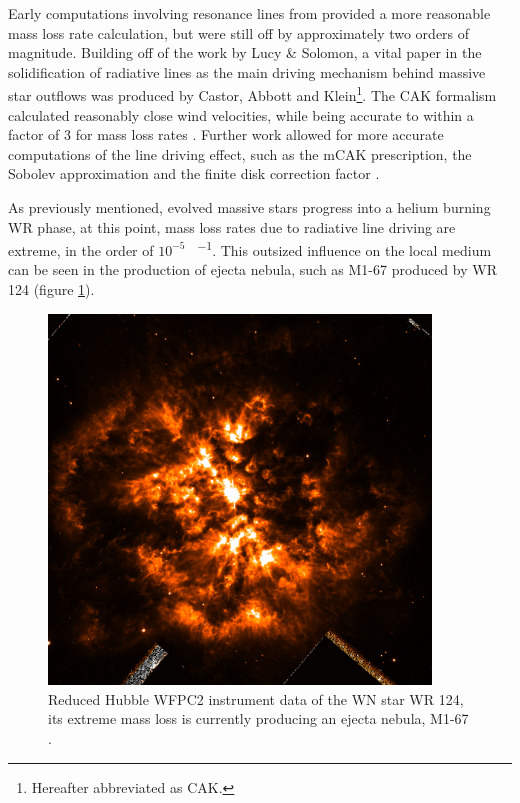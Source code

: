 

Early computations involving resonance lines from \cite{lucy_mass_1970} provided a more reasonable mass loss rate calculation, but were still off by approximately two orders of magnitude.
Building off of the work by Lucy \& Solomon, a vital paper in the solidification of radiative lines as the main driving mechanism behind massive star outflows was produced by Castor, Abbott and Klein\footnote{Hereafter abbreviated as CAK.}.
The CAK formalism calculated reasonably close wind velocities, while being accurate to within a factor of 3 for mass loss rates \parencite{castor_radiation-driven_1975}.
Further work allowed for more accurate computations of the line driving effect, such as the mCAK prescription, the Sobolev approximation and the finite disk correction factor \parencite{pauldrachRadiationdrivenWindsHot1986}.


As previously mentioned, evolved massive stars progress into a helium burning WR phase, at this point, mass loss rates due to radiative line driving are extreme, in the order of $10^{-5}$ \si{\solarmass\per\year}.
This outsized influence on the local medium can be seen in the production of ejecta nebula, such as M1-67 produced by WR 124 (figure \ref{fig:wr124}).

\begin{figure}[h]
  \centering
  \includegraphics[width=4in]{assets/WR124.png}
  \caption[M1-67 nebula around WR 124]{Reduced Hubble WFPC2 instrument data of the WN star WR 124, its extreme mass loss is currently producing an ejecta nebula, M1-67 \parencite{2010ApJ...724L..90M}.}
  \label{fig:wr124}
\end{figure}

